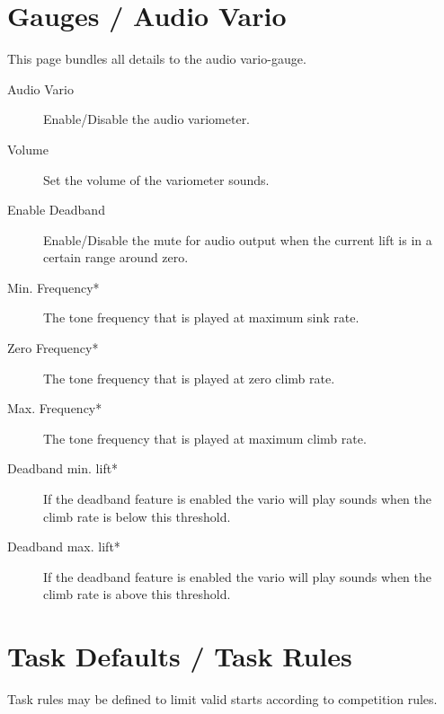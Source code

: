 \section{Gauges / Audio Vario}\label{sec:audiovario-gauge}

This page bundles all details to the audio vario-gauge. \label{conf:audiovariogauge}

\begin{description}
\item[Audio Vario]  Enable/Disable the audio variometer.
\item[Volume]  Set the volume of the variometer sounds.
\item[Enable Deadband]  Enable/Disable the mute for audio output when the current lift is in a certain range around zero.
\item[Min. Frequency*]  The tone frequency that is played at maximum sink rate.
\item[Zero Frequency*]  The tone frequency that is played at zero climb rate.
\item[Max. Frequency*]  The tone frequency that is played at maximum climb rate.
\item[Deadband min. lift*]  If the deadband feature is enabled the vario will play sounds when the climb rate is below this threshold.
\item[Deadband max. lift*]  If the deadband feature is enabled the vario will play sounds when the climb rate is above this threshold.
\end{description}


\section{Task Defaults / Task Rules}

Task rules may be defined to limit valid starts according to competition
rules. \label{conf:taskrules}

